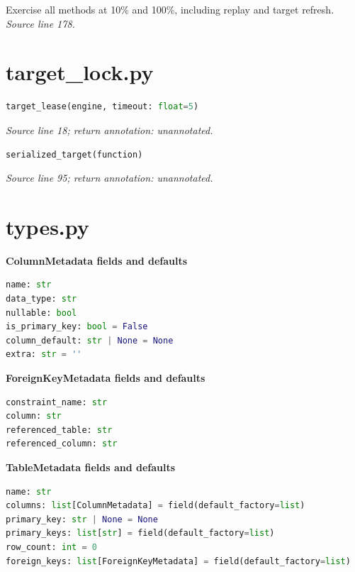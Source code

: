 {\small Exercise all methods at 10\% and 100\%, including replay and target refresh. \textit{Source line 178.}}

\section{target\_lock.py}




\begin{lstlisting}[language=Python]
target_lease(engine, timeout: float=5)
\end{lstlisting}


{\small \textit{Source line 18; return annotation: unannotated.}}



\begin{lstlisting}[language=Python]
serialized_target(function)
\end{lstlisting}


{\small \textit{Source line 95; return annotation: unannotated.}}

\section{types.py}


\textbf{ColumnMetadata fields and defaults}


\begin{lstlisting}[language=Python]
name: str
data_type: str
nullable: bool
is_primary_key: bool = False
column_default: str | None = None
extra: str = ''
\end{lstlisting}


\textbf{ForeignKeyMetadata fields and defaults}


\begin{lstlisting}[language=Python]
constraint_name: str
column: str
referenced_table: str
referenced_column: str
\end{lstlisting}


\textbf{TableMetadata fields and defaults}


\begin{lstlisting}[language=Python]
name: str
columns: list[ColumnMetadata] = field(default_factory=list)
primary_key: str | None = None
primary_keys: list[str] = field(default_factory=list)
row_count: int = 0
foreign_keys: list[ForeignKeyMetadata] = field(default_factory=list)
\end{lstlisting}



